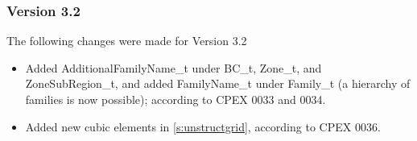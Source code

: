 \subsubsection{Version 3.2}
The following changes were made for Version 3.2

\begin{itemize}
\item Added AdditionalFamilyName\_t under BC\_t, Zone\_t, and ZoneSubRegion\_t, and added
      FamilyName\_t under Family\_t (a hierarchy of families is now possible); according
      to CPEX 0033 and 0034.
\item Added new cubic elements in \autoref{s:unstructgrid}, according to CPEX 0036.
\end{itemize}
